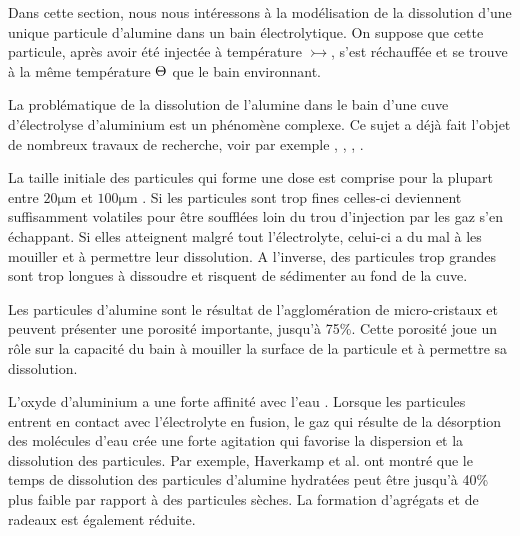Dans cette section, nous nous intéressons à la modélisation de la
dissolution d'une unique particule d'alumine dans un bain
électrolytique. On suppose que cette particule, après avoir été
injectée à température $\tinj$, s'est réchauffée et se trouve à la
même température $\Theta$ que le bain environnant.

La problématique de la dissolution de l'alumine dans le bain d'une
cuve d'électrolyse d'aluminium est un phénomène complexe. Ce sujet a
déjà fait l'objet de nombreux travaux de recherche, voir par exemple
\cite{Dassylva2015}, \cite{Kvande1986}, \cite{Gerlach1975},
\cite{Solheim1995}.

La taille initiale des particules qui forme une dose est comprise pour
la plupart entre $\num{20}\si{\micro\meter}$ et
$\num{100}\si{\micro\meter}$ \cite{Fini2017}. Si les particules sont
trop fines celles-ci deviennent suffisamment volatiles pour être
soufflées loin du trou d'injection par les gaz s'en échappant. Si
elles atteignent malgré tout l'électrolyte, celui-ci a du mal à les
mouiller et à permettre leur dissolution. A l'inverse, des particules
trop grandes sont trop longues à dissoudre et risquent de sédimenter
au fond de la cuve.

Les particules d'alumine sont le résultat de l'agglomération de
micro-cristaux et peuvent présenter une porosité importante, jusqu'à
\num{75}\%. Cette porosité joue un rôle sur la capacité du bain à
mouiller la surface de la particule et à permettre sa dissolution.

L'oxyde d'aluminium a une forte affinité avec l'eau
\cite{Patterson2001}. Lorsque les particules entrent en contact avec
l'électrolyte en fusion, le gaz qui résulte de la désorption des
molécules d'eau crée une forte agitation qui favorise la dispersion et
la dissolution des particules. Par exemple, Haverkamp et
al. \cite{Haverkamp1994} ont montré que le temps de dissolution des
particules d'alumine hydratées peut être jusqu'à \num{40}\% plus
faible par rapport à des particules sèches. La formation d'agrégats
et de radeaux est également réduite.

